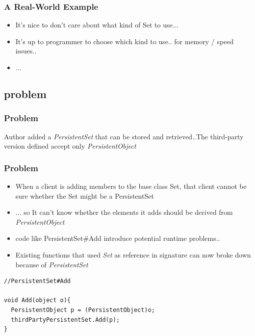 \documentclass{beamer}
\begin{document}
\begin{frame}
  \frametitle{A Real-World Example}
  \begin{itemize}
	\item<+-> It's nice to don't care about what kind of Set to use... 
	\item<+-> It's up to programmer to choose which kind to use.. for memory / speed issues..
	\item<+-> ...
   \end{itemize}
\end{frame}

\subsection{problem}
\begin{frame}
  \frametitle{Problem}
	Author added a \textit{PersistentSet} that can be stored and retrieved..The third-party version defined accept only \textit{PersistentObject} \\
	\begin{center}
	\end{center}
\end{frame}

\begin{frame}[containsverbatim]
  \frametitle{Problem}
  \begin{itemize}
	\item When a client is adding members to the base class Set, that client cannot be sure whether the Set might be a PersistentSet 
	\item ... so It can't know whether the elements it adds should be derived from \textit{PersistentObject}
	\item code like PersistentSet\#Add introduce potential runtime problems..
	\item Existing functions that used \textit{Set} as reference in signature can now broke down because of \textit{PersistentSet}
   \end{itemize}
   \begin{lstlisting}
//PersistentSet#Add
   
void Add(object o){
  PersistentObject p = (PersistentObject)o;
  thirdPartyPersistentSet.Add(p);
}
	\end{lstlisting}
\end{frame}
\end{document}
